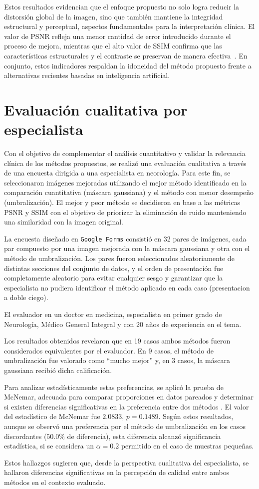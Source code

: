Estos resultados evidencian que el enfoque propuesto no solo logra reducir la distorsión global de la imagen, sino que también mantiene la integridad estructural y perceptual, aspectos fundamentales para la interpretación clínica. El valor de PSNR refleja una menor cantidad de error introducido durante el proceso de mejora, mientras que el alto valor de SSIM confirma que las características estructurales y el contraste se preservan de manera efectiva~\cite{wang2004image,ImageProcessingBook}. En conjunto, estos indicadores respaldan la idoneidad del método propuesto frente a alternativas recientes basadas en inteligencia artificial.


\section{Evaluación cualitativa por especialista}

Con el objetivo de complementar el análisis cuantitativo y validar la relevancia clínica de los métodos propuestos, se realizó una evaluación cualitativa a través de una encuesta dirigida a una especialista en neorología. Para este fin, se seleccionaron imágenes mejoradas utilizando el mejor método identificado en la comparación cuantitativa (máscara gaussiana) y el método con menor desempeño (umbralización). El mejor y peor método se decidieron en base a las métricas PSNR y SSIM con el objetivo de priorizar la eliminación de ruido manteniendo una similaridad con la imagen original.

La encuesta diseñado en \texttt{Google Forms} \cite{encuesta2025} consistió en 32 pares de imágenes, cada par compuesto por una imagen mejorada con la máscara gaussiana y otra con el método de umbralización. Los pares fueron seleccionados aleatoriamente de distintas secciones del conjunto de datos, y el orden de presentación fue completamente aleatorio para evitar cualquier sesgo y garantizar que la especialista no pudiera identificar el método aplicado en cada caso (presentacion a doble ciego).

El evaluador en un doctor en medicina, especialista en primer grado de Neurología, Médico General Integral y con 20 años de experiencia en el tema.

Los resultados obtenidos revelaron que en 19 casos ambos métodos fueron considerados equivalentes por el evaluador. En 9 casos, el método de umbralización fue valorado como “mucho mejor” y, en 3 casos, la máscara gaussiana recibió dicha calificación.

Para analizar estadísticamente estas preferencias, se aplicó la prueba de McNemar, adecuada para comparar proporciones en datos pareados y determinar si existen diferencias significativas en la preferencia entre dos métodos \cite{mcnemar}. El valor del estadístico de McNemar fue $2.0833$, $p = 0.1489$. Según estos resultados, aunque se observó una preferencia por el método de umbralización en los casos discordantes ($50.0\%$ de diferencia), esta diferencia alcanzó significancia estadística, si se considera un $\alpha = 0.2$ permitido en el caso de muestras pequeñas.

Estos hallazgos sugieren que, desde la perspectiva cualitativa del especialista, se hallaron diferencias significativas en la percepción de calidad entre ambos métodos en el contexto evaluado.